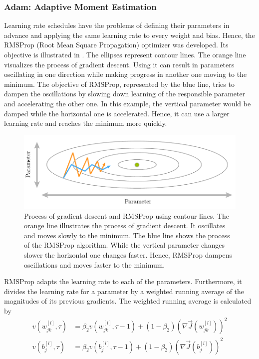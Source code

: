 \subsubsection{Adam: Adaptive Moment Estimation}
\label{sec:training-adam}
Learning rate schedules have the problems of defining their parameters in advance and applying the same learning rate to every weight and bias.
Hence, the RMSProp (Root Mean Square Propagation) optimizer was developed\cite{Tieleman2012}.
Its objective is illustrated in .
The ellipses represent contour lines.
The orange line visualizes the process of gradient descent.
Using it can result in parameters oscillating in one direction while making progress in another one moving to the minimum.
The objective of RMSProp, represented by the blue line, tries to dampen the oscillations by slowing down learning of the responsible parameter and accelerating the other one.
In this example, the vertical parameter would be damped while the horizontal one is accelerated.
Hence, it can use a larger learning rate and reaches the minimum more quickly.
\begin{figure}
	\centering
	\includegraphics[]{images/rmsprop.pdf}
	\caption[Process of gradient descent and RMSProp]{Process of gradient descent and RMSProp using contour lines. The orange line illustrates the process of gradient descent. It oscillates and moves slowly to the minimum. The blue line shows the process of the RMSProp algorithm. While the vertical parameter changes slower the horizontal one changes faster. Hence, RMSProp dampens oscillations and moves faster to the minimum.}
	\label{fig:rmsprop}
\end{figure}
RMSProp adapts the learning rate to each of the parameters.
Furthermore, it divides the learning rate for a parameter by a weighted running average of the magnitudes of its previous gradients.
The weighted running average is calculated by
\begin{subequations}
	\label{eq:adam-second-momentum}
	\begin{align}
		v(w^{[l]}_{jk}, \tau) &= \beta_2 v(w^{[l]}_{jk}, \tau - 1) + (1-\beta_2) (\nabla \vec{J}(w^{[l]}_{jk}))^2 \\
		v(b^{[l]}_{j}, \tau) &= \beta_2 v(b^{[l]}_{j}, \tau - 1) + (1-\beta_2) (\nabla \vec{J}(b^{[l]}_{j}))^2
	\end{align}
\end{subequations}
